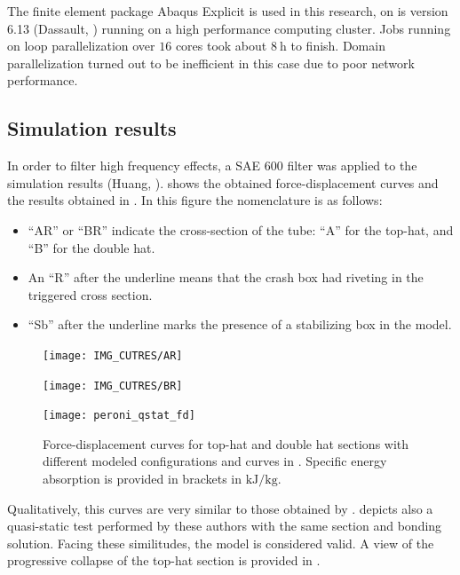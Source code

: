 \documentclass[cmfonts]{witpress}
\begin{document}
The finite element package Abaqus Explicit is used in this research, on is version 6.13 (Dassault, \cite{Abaqus613Manual}) running on a high performance computing cluster. Jobs running on loop parallelization over $16$ cores took about $\SI{8}{\hour}$ to finish. Domain parallelization turned out to be inefficient in this case due to poor network performance.

\subsection{Simulation results}


In order to filter high frequency effects, a SAE 600 filter was applied to the simulation results (Huang, \cite{Huang}).  shows the obtained force-displacement curves and the results obtained in \cite{Peroni2009}. In this figure the nomenclature is as follows:
\begin{itemize}
	\item ``AR'' or ``BR'' indicate the cross-section of the tube: ``A'' for the top-hat, and ``B'' for the double hat.
	\item An ``R'' after the underline means that the crash box had riveting in the triggered cross section.
	\item ``Sb'' after the underline marks the presence of a stabilizing box in the model.
\end{itemize}

\begin{figure}[htpb]
	\centering
	\begin{minipage}[b]{.7\linewidth}
		\centering
		\texttt{[image: IMG\_CUTRES/AR]}
	\end{minipage}
	\quad
	\begin{minipage}[b]{.7\linewidth}
		\centering
		\texttt{[image: IMG\_CUTRES/BR]}
	\end{minipage}
	\quad
	\begin{minipage}[b]{.7\linewidth}
		\centering
		\texttt{[image: peroni\_qstat\_fd]}
	\end{minipage}	
	\caption[Force-displacement curves for top-hat and double hat sections with different modeled configurations.]{Force-displacement curves for top-hat and double hat sections with different modeled configurations and curves in \cite{Peroni2009}. Specific energy absorption is provided in brackets in $\si{\kJ/\kg}$.}
	\label{fig:F-D_rough}
\end{figure}

Qualitatively, this curves are very similar to those obtained by \cite{Peroni2009}.  depicts also a quasi-static test performed by these authors with the same section and bonding solution. Facing these similitudes, the model is considered valid. A view of the progressive collapse of the top-hat section is provided in .
\end{document}
